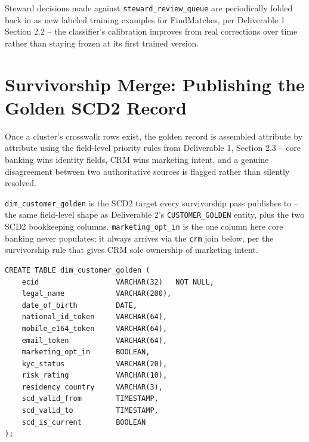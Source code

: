 \documentclass[11pt]{article}
\begin{document}
\begin{note}[On Feedback]
Steward decisions made against \texttt{steward\_review\_queue} are periodically folded back in as new labeled training examples for FindMatches, per Deliverable 1 Section 2.2 -- the classifier's calibration improves from real corrections over time rather than staying frozen at its first trained version.
\end{note}

\section{Survivorship Merge: Publishing the Golden SCD2 Record}
Once a cluster's crosswalk rows exist, the golden record is assembled attribute by attribute using the field-level priority rules from Deliverable 1, Section 2.3 -- core banking wins identity fields, CRM wins marketing intent, and a genuine disagreement between two authoritative sources is flagged rather than silently resolved.

\texttt{dim\_customer\_golden} is the SCD2 target every survivorship pass publishes to -- the same field-level shape as Deliverable 2's \texttt{CUSTOMER\_GOLDEN} entity, plus the two SCD2 bookkeeping columns. \texttt{marketing\_opt\_in} is the one column here core banking never populates; it always arrives via the \texttt{crm} join below, per the survivorship rule that gives CRM sole ownership of marketing intent.

\begin{lstlisting}[language=PseudoSQL, style=codeblock]
CREATE TABLE dim_customer_golden (
    ecid                  VARCHAR(32)   NOT NULL,
    legal_name            VARCHAR(200),
    date_of_birth         DATE,
    national_id_token     VARCHAR(64),
    mobile_e164_token     VARCHAR(64),
    email_token           VARCHAR(64),
    marketing_opt_in      BOOLEAN,
    kyc_status            VARCHAR(20),
    risk_rating           VARCHAR(10),
    residency_country     VARCHAR(3),
    scd_valid_from        TIMESTAMP,
    scd_valid_to          TIMESTAMP,
    scd_is_current        BOOLEAN
);
\end{lstlisting}
\end{document}
